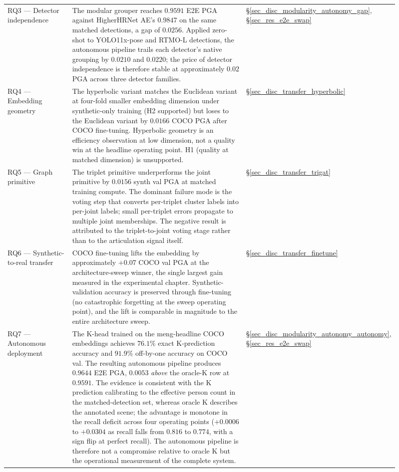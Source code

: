 \begin{longtable}{p{0.18\linewidth}p{0.55\linewidth}p{0.18\linewidth}}
RQ3 --- Detector independence &
The modular grouper reaches $0.9591$ E2E PGA against HigherHRNet AE's $0.9847$ on the same matched detections,
a gap of $0.0256$.
Applied zero-shot to YOLO11x-pose and RTMO-L detections,
the autonomous pipeline trails each detector's native grouping by $0.0210$ and $0.0220$;
the price of detector independence is therefore stable at approximately $0.02$ PGA across three detector families.
& \S\ref{sec_disc_modularity_autonomy_gap}, \S\ref{sec_res_e2e_swap} \\

RQ4 --- Embedding geometry &
The hyperbolic variant matches the Euclidean variant at four-fold smaller embedding dimension under synthetic-only training (H2 supported)
but loses to the Euclidean variant by $0.0166$ COCO PGA after COCO fine-tuning.
Hyperbolic geometry is an efficiency observation at low dimension, not a quality win at the headline operating point.
H1 (quality at matched dimension) is unsupported.
& \S\ref{sec_disc_transfer_hyperbolic} \\

RQ5 --- Graph primitive &
The triplet primitive underperforms the joint primitive by $0.0156$ synth val PGA at matched training compute.
The dominant failure mode is the voting step that converts per-triplet cluster labels into per-joint labels;
small per-triplet errors propagate to multiple joint memberships.
The negative result is attributed to the triplet-to-joint voting stage
rather than to the articulation signal itself.
& \S\ref{sec_disc_transfer_trigat} \\

RQ6 --- Synthetic-to-real transfer &
COCO fine-tuning lifts the embedding by approximately $+0.07$ COCO val PGA at the architecture-sweep winner,
the single largest gain measured in the experimental chapter.
Synthetic-validation accuracy is preserved through fine-tuning (no catastrophic forgetting at the sweep operating point),
and the lift is comparable in magnitude to the entire architecture sweep.
& \S\ref{sec_disc_transfer_finetune} \\

RQ7 --- Autonomous deployment &
The K-head trained on the meng-headline COCO embeddings achieves $76.1\%$ exact K-prediction accuracy and $91.9\%$ off-by-one accuracy on COCO val.
The resulting autonomous pipeline produces $0.9644$ E2E PGA,
$0.0053$ \emph{above} the oracle-K row at $0.9591$.
The evidence is consistent with the K prediction calibrating to the effective person count in the matched-detection set,
whereas oracle K describes the annotated scene;
the advantage is monotone in the recall deficit across four operating points
($+0.0006$ to $+0.0304$ as recall falls from $0.816$ to $0.774$, with a sign flip at perfect recall).
The autonomous pipeline is therefore not a compromise relative to oracle K but the operational measurement of the complete system.
& \S\ref{sec_disc_modularity_autonomy_autonomy}, \S\ref{sec_res_e2e_swap} \\
\end{longtable}
\endgroup
